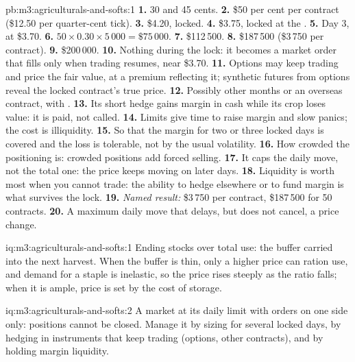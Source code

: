 \begin{solution}{pb:m3:agriculturals-and-softs:1}
\textbf{1.} 30 and 45 cents. \textbf{2.} \$50 per cent per contract (\$12.50 per quarter-cent tick).
\textbf{3.} \$4.20, locked. \textbf{4.} \$3.75, locked at the . \textbf{5.} Day 3, at \$3.70.
\textbf{6.} $50 \times 0.30 \times 5\,000 = \$75\,000$. \textbf{7.} \$112\,500. \textbf{8.} \$187\,500
(\$3\,750 per contract). \textbf{9.} \$200\,000. \textbf{10.} Nothing during the lock: it becomes a
market order that fills only when trading resumes, near \$3.70. \textbf{11.} Options may keep trading and
price the fair value, at a premium reflecting it; synthetic futures from options reveal the locked
contract's true price. \textbf{12.} Possibly other months or an overseas contract, with .
\textbf{13.} Its short hedge gains margin in cash while its crop loses value: it is paid, not called.
\textbf{14.} Limits give time to raise margin and slow panics; the cost is illiquidity. \textbf{15.} So that
the margin for two or three locked days is covered and the loss is tolerable, not by the usual volatility.
\textbf{16.} How crowded the positioning is: crowded positions add forced selling. \textbf{17.} It caps the
daily move, not the total one: the price keeps moving on later days. \textbf{18.} Liquidity is worth most
when you cannot trade: the ability to hedge elsewhere or to fund margin is what survives the lock.
\textbf{19.} \emph{Named result:} \$3\,750 per contract, \$187\,500 for 50 contracts. \textbf{20.} A
maximum daily move that delays, but does not cancel, a price change.
\end{solution}

\begin{solution}{iq:m3:agriculturals-and-softs:1}
Ending stocks over total use: the buffer carried into the next harvest. When the buffer is thin, only a
higher price can ration use, and demand for a staple is inelastic, so the price rises steeply as the ratio
falls; when it is ample, price is set by the cost of storage.
\end{solution}

\begin{solution}{iq:m3:agriculturals-and-softs:2}
A market at its daily limit with orders on one side only: positions cannot be closed. Manage it by sizing
for several locked days, by hedging in instruments that keep trading (options, other contracts), and by
holding margin liquidity.
\end{solution}

